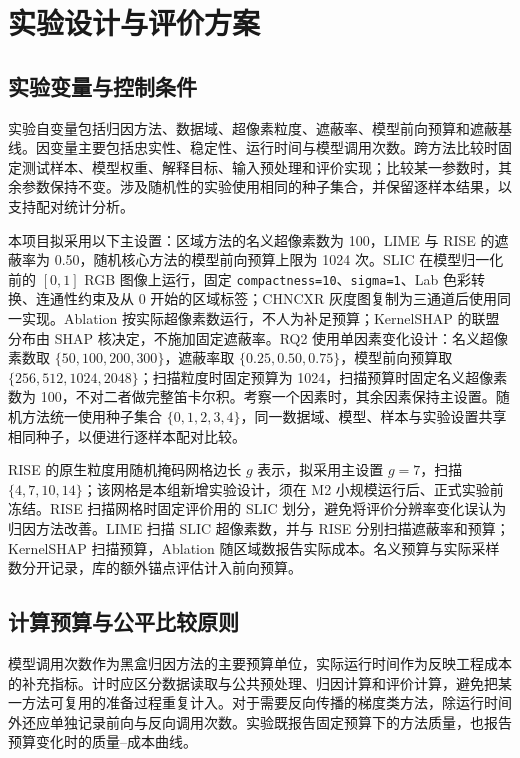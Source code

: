 \FloatBarrier

\chapter{实验设计与评价方案}

\section{实验变量与控制条件}

实验自变量包括归因方法、数据域、超像素粒度、遮蔽率、模型前向预算和遮蔽基线。因变量主要包括忠实性、稳定性、运行时间与模型调用次数。跨方法比较时固定测试样本、模型权重、解释目标、输入预处理和评价实现；比较某一参数时，其余参数保持不变。涉及随机性的实验使用相同的种子集合，并保留逐样本结果，以支持配对统计分析。

本项目拟采用以下主设置：区域方法的名义超像素数为 100，LIME 与 RISE 的遮蔽率为 0.50，随机核心方法的模型前向预算上限为 1024 次。SLIC 在模型归一化前的 $[0,1]$ RGB 图像上运行，固定 \texttt{compactness=10}、\texttt{sigma=1}、Lab 色彩转换、连通性约束及从 0 开始的区域标签；CHNCXR 灰度图复制为三通道后使用同一实现。Ablation 按实际超像素数运行，不人为补足预算；KernelSHAP 的联盟分布由 SHAP 核决定，不施加固定遮蔽率。RQ2 使用单因素变化设计：名义超像素数取 $\{50,100,200,300\}$，遮蔽率取 $\{0.25,0.50,0.75\}$，模型前向预算取 $\{256,512,1024,2048\}$；扫描粒度时固定预算为 1024，扫描预算时固定名义超像素数为 100，不对二者做完整笛卡尔积。考察一个因素时，其余因素保持主设置。随机方法统一使用种子集合 $\{0,1,2,3,4\}$，同一数据域、模型、样本与实验设置共享相同种子，以便进行逐样本配对比较。



RISE 的原生粒度用随机掩码网格边长 $g$ 表示，拟采用主设置 $g=7$，扫描 $\{4,7,10,14\}$；该网格是本组新增实验设计，须在 M2 小规模运行后、正式实验前冻结。RISE 扫描网格时固定评价用的 SLIC 划分，避免将评价分辨率变化误认为归因方法改善。LIME 扫描 SLIC 超像素数，并与 RISE 分别扫描遮蔽率和预算；KernelSHAP 扫描预算，Ablation 随区域数报告实际成本。名义预算与实际采样数分开记录，库的额外锚点评估计入前向预算。

\section{计算预算与公平比较原则}

模型调用次数作为黑盒归因方法的主要预算单位，实际运行时间作为反映工程成本的补充指标。计时应区分数据读取与公共预处理、归因计算和评价计算，避免把某一方法可复用的准备过程重复计入。对于需要反向传播的梯度类方法，除运行时间外还应单独记录前向与反向调用次数。实验既报告固定预算下的方法质量，也报告预算变化时的质量--成本曲线。

